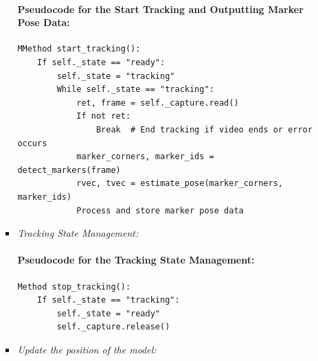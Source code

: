 \documentclass[12pt]{article}
\begin{document}
\begin{enumerate}
\begin{enumerate}
\begin{itemize}
                                    \paragraph{Pseudocode for the Start Tracking and Outputting Marker Pose Data:}
                                    \begin{verbatim}
MMethod start_tracking():
    If self._state == "ready":
        self._state = "tracking"
        While self._state == "tracking":
            ret, frame = self._capture.read()
            If not ret:
                Break  # End tracking if video ends or error occurs
            marker_corners, marker_ids = detect_markers(frame)
            rvec, tvec = estimate_pose(marker_corners, marker_ids)
            Process and store marker pose data
                              \end{verbatim}
                              \item \textit{Tracking State Management:}
                                    \paragraph{Pseudocode for the Tracking State Management:}
                                    \begin{verbatim}
Method stop_tracking():
    If self._state == "tracking":
        self._state = "ready"
        self._capture.release()
                              \end{verbatim}
                              \item \textit{Update the position of the model:}

\end{itemize}
\end{enumerate}
\end{enumerate}
\end{document}
